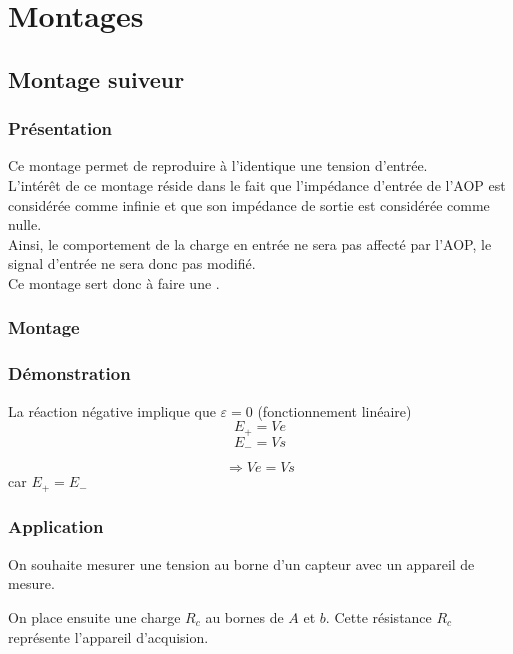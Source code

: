  \part{Montages}

\chapter{Montage suiveur }


\section{Présentation}


Ce montage permet de reproduire à l’identique une tension d'entrée. \\
L'intérêt de ce montage réside dans le fait que l’impédance d’entrée de l’AOP est considérée comme infinie et que son impédance de sortie est considérée comme nulle.\\

Ainsi, le comportement de la charge en entrée ne sera pas affecté par l’AOP, le signal d'entrée ne sera donc pas modifié. \\

Ce montage sert donc à faire une .

\section{Montage}



\section{Démonstration} 
La réaction négative implique que $\varepsilon=0$ (fonctionnement linéaire)
$$ E_+=Ve $$
$$ E_-=Vs $$

$$ \Rightarrow Ve=Vs$$ car $E_+=E_-$


\section{Application}

\begin{exemple}
On souhaite mesurer une tension au borne d’un capteur avec un appareil de mesure.


On place ensuite une charge $R_c$ au bornes de $A$ et $b$. Cette résistance $R_c$ représente l'appareil d'acquision.

\end{exemple}

